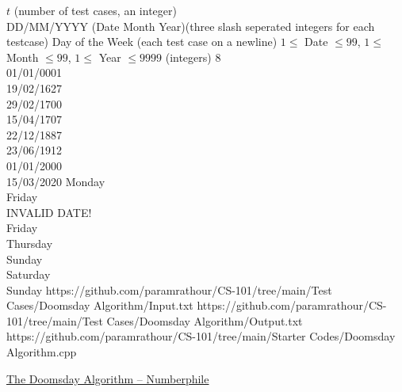 \begin{testcasesMore}
	{$t$ \hfill(number of test cases, an integer)\\
	DD/MM/YYYY (Date Month Year)\hfill(three slash seperated integers for each testcase)}
	{Day of the Week
 \hfill{(each test case on a newline)}}
	{$1 \leq$ Date $\leq 99$, $1 \leq$ Month $\leq 99$, $1 \leq$ Year $\leq 9999$ \hfill(integers)}
	{8\\01/01/0001\\19/02/1627\\29/02/1700\\15/04/1707\\22/12/1887\\23/06/1912\\01/01/2000\\15/03/2020}
	{Monday\\Friday\\INVALID DATE!\\Friday\\Thursday\\Sunday\\Saturday\\Sunday}
	{https://github.com/paramrathour/CS-101/tree/main/Test Cases/Doomsday Algorithm/Input.txt}
	{https://github.com/paramrathour/CS-101/tree/main/Test Cases/Doomsday Algorithm/Output.txt}
	{https://github.com/paramrathour/CS-101/tree/main/Starter Codes/Doomsday Algorithm.cpp}
\end{testcasesMore}
\begin{funvideo}{\label{sec:fvdoomsday}}
\href{https://youtu.be/z2x3SSBVGJU}{The Doomsday Algorithm -- Numberphile}
\end{funvideo}